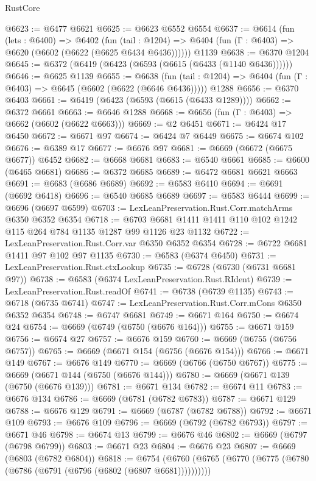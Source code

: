 \begin{lexlean}{RustCore}
\begin{coremodule}
@6623 := @6477 @6621
@6625 := @6623 @6552 @6554
@6637 := @6614
    (fun (lets : @6400) =>
    @6402
      (fun (tail : @1204) => @6404 (fun (Γ : @6403) => @6620 (@6602 (@6622 (@6625 @6434 @6436))))))
    @1139
@6638 := @6370 @1204
@6645 := @6372 (@6419 (@6423 (@6593 (@6615 (@6433 (@1140 @6436))))))
@6646 := @6625 @1139
@6655 := @6638
    (fun (tail : @1204) => @6404 (fun (Γ : @6403) => @6645 (@6602 (@6622 (@6646 @6436)))))
    @1288
@6656 := @6370 @6403
@6661 := @6419 (@6423 (@6593 (@6615 (@6433 @1289))))
@6662 := @6372 @6661
@6663 := @6646 @1288
@6668 := @6656 (fun (Γ : @6403) => @6662 (@6602 (@6622 @6663)))
@6669 := @2 @6451
@6671 := @6424 @17 @6450
@6672 := @6671 @97
@6674 := @6424 @7 @6449
@6675 := @6674 @102
@6676 := @6389 @17
@6677 := @6676 @97
@6681 := @6669 (@6672 (@6675 @6677)) @6452
@6682 := @6668 @6681
@6683 := @6540 @6661
@6685 := @6600 (@6465 @6681)
@6686 := @6372 @6685
@6689 := @6472 @6681 @6621 @6663
@6691 := @6683 (@6686 @6689)
@6692 := @6583 @6410
@6694 := @6691 (@6692 @6418)
@6696 := @6540 @6685 @6689
@6697 := @6583 @6444
@6699 := @6696 (@6697 @6599)
@6703 := LexLeanPreservation.Rust.Corr.matchArms @6350 @6352 @6354
@6718 := @6703 @6681 @1411 @1411 @110 @102 @1242 @115 @264 @784 @1135 @1287 @99 @1126 @23 @1132
@6722 := LexLeanPreservation.Rust.Corr.var @6350 @6352 @6354
@6728 := @6722 @6681 @1411 @97 @102 @97 @1135
@6730 := @6583 (@6374 @6450)
@6731 := LexLeanPreservation.Rust.ctxLookup
@6735 := @6728 (@6730 (@6731 @6681 @97))
@6738 := @6583 (@6374 LexLeanPreservation.Rust.RIdent)
@6739 := LexLeanPreservation.Rust.readOf
@6741 := @6738 (@6739 @1135)
@6743 := @6718 (@6735 @6741)
@6747 := LexLeanPreservation.Rust.Corr.mCons @6350 @6352 @6354
@6748 := @6747 @6681
@6749 := @6671 @164
@6750 := @6674 @24
@6754 := @6669 (@6749 (@6750 (@6676 @164)))
@6755 := @6671 @159
@6756 := @6674 @27
@6757 := @6676 @159
@6760 := @6669 (@6755 (@6756 @6757))
@6765 := @6669 (@6671 @154 (@6756 (@6676 @154)))
@6766 := @6671 @149
@6767 := @6676 @149
@6770 := @6669 (@6766 (@6750 @6767))
@6775 := @6669 (@6671 @144 (@6750 (@6676 @144)))
@6780 := @6669 (@6671 @139 (@6750 (@6676 @139)))
@6781 := @6671 @134
@6782 := @6674 @11
@6783 := @6676 @134
@6786 := @6669 (@6781 (@6782 @6783))
@6787 := @6671 @129
@6788 := @6676 @129
@6791 := @6669 (@6787 (@6782 @6788))
@6792 := @6671 @109
@6793 := @6676 @109
@6796 := @6669 (@6792 (@6782 @6793))
@6797 := @6671 @46
@6798 := @6674 @13
@6799 := @6676 @46
@6802 := @6669 (@6797 (@6798 @6799))
@6803 := @6671 @23
@6804 := @6676 @23
@6807 := @6669 (@6803 (@6782 @6804))
@6818 := @6754 (@6760 (@6765 (@6770 (@6775 (@6780 (@6786 (@6791 (@6796 (@6802 (@6807 @6681))))))))))

\end{coremodule}
\end{lexlean}
